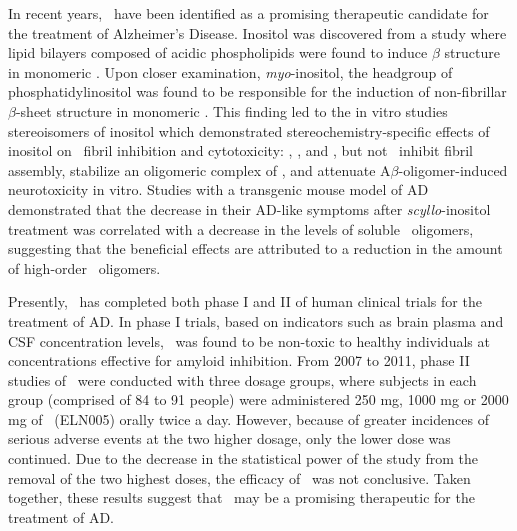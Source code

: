 In recent years, \scylloi\ have been identified as a promising therapeutic candidate for the treatment of Alzheimer's Disease. Inositol was discovered from a study where lipid bilayers composed of acidic phospholipids were found to induce $\beta$ structure in monomeric .\cite{McLaurin:1996p584} Upon closer examination, \emph{myo}-inositol, the headgroup of phosphatidylinositol was found to be responsible for the induction of non-fibrillar $\beta$-sheet structure in monomeric .\cite{McLaurin:1998p3976, McLaurin:1998p3149} This finding led to the in vitro studies stereoisomers of inositol which demonstrated stereochemistry-specific effects of inositol on \abeta\ fibril inhibition and cytotoxicity: \scyllo, \myo, and \epi, but not \chiroi\ inhibit  fibril assembly, stabilize an oligomeric complex of , and attenuate A$\beta$-oligomer-induced neurotoxicity in vitro.\cite{McLaurin:2000bq} Studies with a transgenic mouse model of AD demonstrated that the decrease in their AD-like symptoms after \emph{scyllo}-inositol treatment was correlated with a decrease in the levels of soluble \abeta\ oligomers, suggesting that the beneficial effects are attributed to a reduction in the amount of high-order \abeta\ oligomers.\cite{McLaurin:2006eb}


Presently, \scylloi\ has completed both phase I and II of human clinical trials for the treatment of AD.\cite{Salloway:2011im} In phase I trials, based on indicators such as brain plasma and CSF concentration levels, \scylloi\ was found to be non-toxic to healthy individuals at concentrations effective for amyloid inhibition. From 2007 to 2011, phase II studies of \scylloi\ were conducted with three dosage groups, where subjects in each group (comprised of 84 to 91 people) were administered 250 mg, 1000 mg or 2000 mg of \scylloi\ (ELN005) orally twice a day. However, because of greater incidences of serious adverse events at the two higher dosage, only the lower dose was continued. Due to the decrease in the statistical power of the study from the removal of the two highest doses, the efficacy of \scylloi\ was not conclusive.\cite{Salloway:2011im} Taken together, these results suggest that \scylloi\ may be a promising therapeutic for the treatment of AD.\cite{Nitz:2008jl,Sun:2008ko} %

